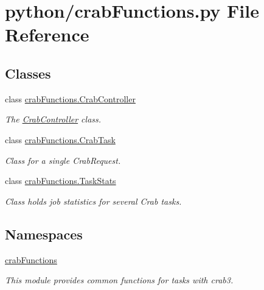 \section{python/crab\-Functions.py File Reference}
\label{crabFunctions_8py}
\subsection*{Classes}
\begin{DoxyCompactItemize}
\item 
class \hyperlink{classcrabFunctions_1_1CrabController}{crab\-Functions.\-Crab\-Controller}
\begin{DoxyCompactList}\small\item\em The \hyperlink{classcrabFunctions_1_1CrabController}{Crab\-Controller} class. \end{DoxyCompactList}\item 
class \hyperlink{classcrabFunctions_1_1CrabTask}{crab\-Functions.\-Crab\-Task}
\begin{DoxyCompactList}\small\item\em Class for a single Crab\-Request. \end{DoxyCompactList}\item 
class \hyperlink{classcrabFunctions_1_1TaskStats}{crab\-Functions.\-Task\-Stats}
\begin{DoxyCompactList}\small\item\em Class holds job statistics for several Crab tasks. \end{DoxyCompactList}\end{DoxyCompactItemize}
\subsection*{Namespaces}
\begin{DoxyCompactItemize}
\item 
\hyperlink{namespacecrabFunctions}{crab\-Functions}
\begin{DoxyCompactList}\small\item\em This module provides common functions for tasks with crab3. \end{DoxyCompactList}\end{DoxyCompactItemize}
